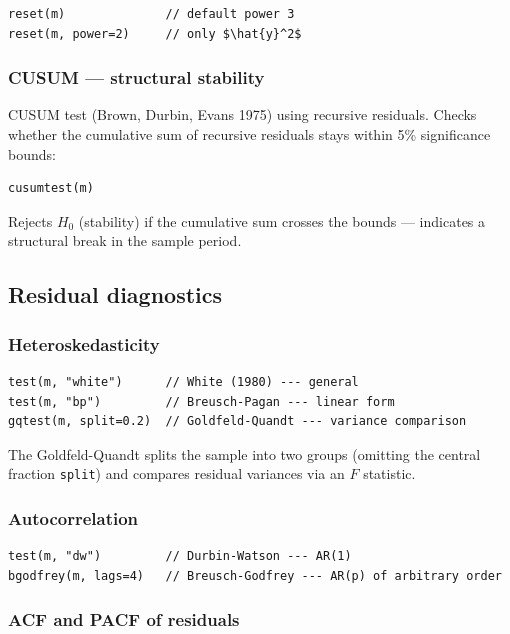 \begin{lstlisting}
reset(m)              // default power 3
reset(m, power=2)     // only $\hat{y}^2$
\end{lstlisting}

\subsubsection*{CUSUM --- structural stability}

CUSUM test (Brown, Durbin, Evans 1975) using recursive residuals. Checks
whether the cumulative sum of recursive residuals stays within 5\%
significance bounds:

\begin{lstlisting}
cusumtest(m)
\end{lstlisting}

Rejects $H_0$ (stability) if the cumulative sum crosses the bounds ---
indicates a structural break in the sample period.

\subsection{Residual diagnostics}

\subsubsection*{Heteroskedasticity}

\begin{lstlisting}
test(m, "white")      // White (1980) --- general
test(m, "bp")         // Breusch-Pagan --- linear form
gqtest(m, split=0.2)  // Goldfeld-Quandt --- variance comparison
\end{lstlisting}

The Goldfeld-Quandt splits the sample into two groups (omitting the central
fraction \texttt{split}) and compares residual variances via an $F$ statistic.

\subsubsection*{Autocorrelation}

\begin{lstlisting}
test(m, "dw")         // Durbin-Watson --- AR(1)
bgodfrey(m, lags=4)   // Breusch-Godfrey --- AR(p) of arbitrary order
\end{lstlisting}

\subsubsection*{ACF and PACF of residuals}

